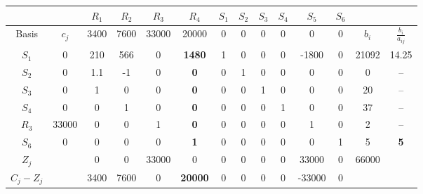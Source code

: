 \documentclass[]{article}
\begin{document}
\begin{table}[!htb]
    \centering
    \begin{tabular}{c|c|c|c|c|c|c|c|c|c|c|c|c|c} %
         & & $R_1$ & $R_2$ & $R_3$ & $R_4$ & $S_1$ & $S_2$ & $S_3$ & $S_4$ & $S_5$ & $S_6$ & & \\ \hline
        Basis & $c_j$ & 3400 & 7600 & 33000 & 20000 & 0 & 0 & 0 & 0 & 0 & 0 & $b_i$ & $\frac{b_i}{a_{ij}}$\\ \hline
        $S_1$ & 0 & 210 & 566 & 0 & \textbf{1480} & 1 & 0 & 0 & 0 & -1800 & 0 & 21092 & 14.25\\ \hline
        $S_2$ & 0 & 1.1 & -1 & 0 & \textbf{0} & 0 & 1 & 0 & 0 & 0 & 0 & 0 & --\\ \hline
        $S_3$ & 0 & 1 & 0 & 0 & \textbf{0} & 0 & 0 & 1 & 0 & 0 & 0 & 20 & --\\ \hline
        $S_4$ & 0 & 0 & 1 & 0 & \textbf{0} & 0 & 0 & 0 & 1 & 0 & 0 & 37 & --\\ \hline
        $R_3$ & 33000 & 0 & 0 & 1 & \textbf{0} & 0 & 0 & 0 & 0 & 1 & 0 & 2 & -- \\ \hline
        $S_6$ & 0 & 0 & 0 & 0 & \textbf{1} & 0 & 0 & 0 & 0 & 0 & 1 & 5 & \textbf{5}\\ \hline
        $Z_j$ & & 0 & 0 & 33000 & 0 & 0 & 0 & 0 & 0 & 33000 & 0 & 66000 & \\
        $C_j-Z_j$ & & 3400 & 7600 & 0 & \textbf{20000} & 0 & 0 & 0 & 0 & -33000 & 0 & & \\ 
    \end{tabular}
\end{table}
\end{document}
